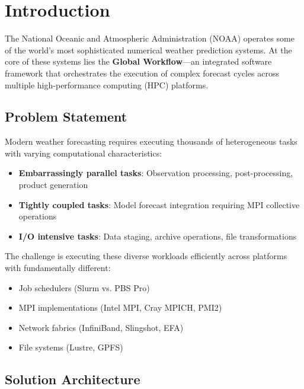 \documentclass[11pt,a4paper,twoside]{article}
\begin{document}
\newpage
\tableofcontents
\newpage
\listoffigures
\listoftables
\newpage

\section{Introduction}
\label{sec:introduction}

The National Oceanic and Atmospheric Administration (NOAA) operates some of the world's most sophisticated numerical weather prediction systems. At the core of these systems lies the \textbf{Global Workflow}---an integrated software framework that orchestrates the execution of complex forecast cycles across multiple high-performance computing (HPC) platforms.

\subsection{Problem Statement}

Modern weather forecasting requires executing thousands of heterogeneous tasks with varying computational characteristics:

\begin{itemize}[noitemsep]
    \item \textbf{Embarrassingly parallel tasks}: Observation processing, post-processing, product generation
    \item \textbf{Tightly coupled tasks}: Model forecast integration requiring MPI collective operations
    \item \textbf{I/O intensive tasks}: Data staging, archive operations, file transformations
\end{itemize}

The challenge is executing these diverse workloads efficiently across platforms with fundamentally different:
\begin{itemize}[noitemsep]
    \item Job schedulers (Slurm vs. PBS Pro)
    \item MPI implementations (Intel MPI, Cray MPICH, PMI2)
    \item Network fabrics (InfiniBand, Slingshot, EFA)
    \item File systems (Lustre, GPFS)
\end{itemize}

\subsection{Solution Architecture}
\end{document}
